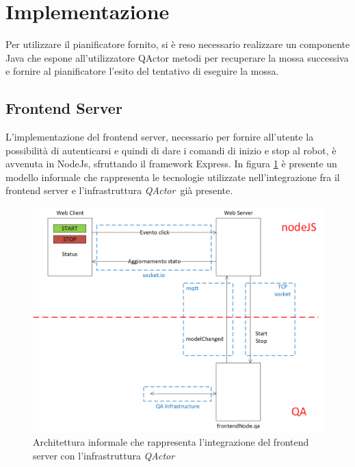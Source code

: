\documentclass{llncs}
\newcommand{\version}{7}
\newcommand{\node}{\textsf{NodeJs}}
\newcommand{\qa}{\textsf{\textit{QActor}}}
\newcommand{\labelsec}[1]{\label{sec:#1}}
\begin{document}
\section{Implementazione}
\labelsec{Implementation}
Per utilizzare il pianificatore fornito, si è reso necessario realizzare un componente Java che espone all'utilizzatore QActor metodi per recuperare la mossa successiva e fornire al pianificatore l'esito del tentativo di eseguire la mossa.

\subsection{Frontend Server}
L'implementazione del frontend server, necessario per fornire all'utente la possibilità di autenticarsi e quindi di dare i comandi di inizio e stop al robot, è avvenuta in \node, sfruttando il framework Express. In figura \ref{fig:frontend} è presente un modello informale che rappresenta le tecnologie utilizzate nell'integrazione fra il frontend server e l'infrastruttura \qa\ già presente.

\begin{figure}
	\centering
	\includegraphics[scale=0.5]{img/frontend.png}
	\caption{Architettura informale che rappresenta l'integrazione del frontend server con l'infrastruttura \qa}
	\label{fig:frontend}
\end{figure}
\end{document}
